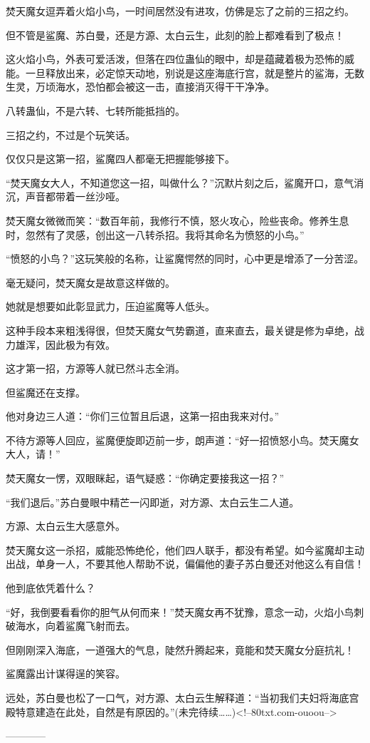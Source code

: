 \begin{this_body}
焚天魔女逗弄着火焰小鸟，一时间居然没有进攻，仿佛是忘了之前的三招之约。

但不管是鲨魔、苏白曼，还是方源、太白云生，此刻的脸上都难看到了极点！

这火焰小鸟，外表可爱活泼，但落在四位蛊仙的眼中，却是蕴藏着极为恐怖的威能。一旦释放出来，必定惊天动地，别说是这座海底行宫，就是整片的鲨海，无数生灵，万顷海水，恐怕都会被这一击，直接消灭得干干净净。

八转蛊仙，不是六转、七转所能抵挡的。

三招之约，不过是个玩笑话。

仅仅只是这第一招，鲨魔四人都毫无把握能够接下。

“焚天魔女大人，不知道您这一招，叫做什么？”沉默片刻之后，鲨魔开口，意气消沉，声音都带着一丝沙哑。

焚天魔女微微而笑：“数百年前，我修行不慎，怒火攻心，险些丧命。修养生息时，忽然有了灵感，创出这一八转杀招。我将其命名为愤怒的小鸟。”

“愤怒的小鸟？”这玩笑般的名称，让鲨魔愕然的同时，心中更是增添了一分苦涩。

毫无疑问，焚天魔女是故意这样做的。

她就是想要如此彰显武力，压迫鲨魔等人低头。

这种手段本来粗浅得很，但焚天魔女气势霸道，直来直去，最关键是修为卓绝，战力雄浑，因此极为有效。

这才第一招，方源等人就已然斗志全消。

但鲨魔还在支撑。

他对身边三人道：“你们三位暂且后退，这第一招由我来对付。”

不待方源等人回应，鲨魔便旋即迈前一步，朗声道：“好一招愤怒小鸟。焚天魔女大人，请！”

焚天魔女一愣，双眼眯起，语气疑惑：“你确定要接我这一招？”

“我们退后。”苏白曼眼中精芒一闪即逝，对方源、太白云生二人道。

方源、太白云生大感意外。

焚天魔女这一杀招，威能恐怖绝伦，他们四人联手，都没有希望。如今鲨魔却主动出战，单身一人，不要其他人帮助不说，偏偏他的妻子苏白曼还对他这么有自信！

他到底依凭着什么？

“好，我倒要看看你的胆气从何而来！”焚天魔女再不犹豫，意念一动，火焰小鸟刺破海水，向着鲨魔飞射而去。

但刚刚深入海底，一道强大的气息，陡然升腾起来，竟能和焚天魔女分庭抗礼！

鲨魔露出计谋得逞的笑容。

远处，苏白曼也松了一口气，对方源、太白云生解释道：“当初我们夫妇将海底宫殿特意建造在此处，自然是有原因的。”(未完待续……)<!--80txt.com-ouoou-->

------------

\end{this_body}

